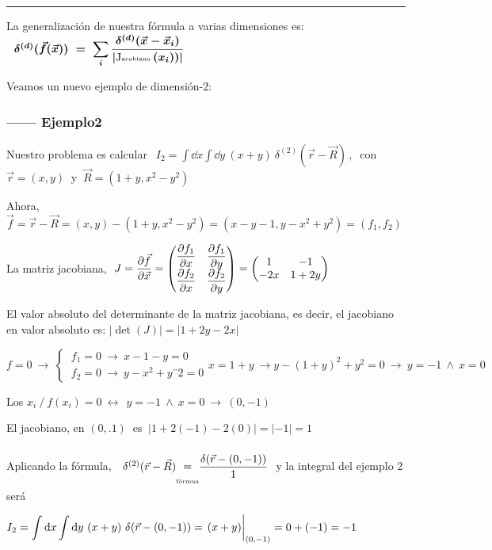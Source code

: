 \begin{center}\rule{200pt}{0.2pt}\end{center}
\vspace{0.5cm}


La generalización de nuestra fórmula a varias dimensiones es:
$\ \ \boldsymbol{ \delta^{(d)}( \vec f( \vec x)) \ = \ \displaystyle \sum_i \dfrac {\delta^{(d)}( \vec x-  \vec x_i)}{|\text{J\tiny{acobiano} }( x_i))|}  }$

Veamos un nuevo ejemplo de dimensión-2:
\subsubsection{------ Ejemplo2}

Nuestro problema es calcular $\ \ \displaystyle I_2=  \int \dd x \int \dd y \ (x+y)\ \delta^{(2)} (\vec r-\vec R)\, , \ $ con $\vec r=(x,y)\ $ y $\ \vec R=(1+y,x^2-y^2)$

Ahora, $\vec f=\vec r-\vec R=(x,y)-(1+y,x^2-y^2)=(x-y-1,y-x^2+y^2)=(f_1,f_2)$

La matriz jacobiana, $\ J=\displaystyle \pdv{\vec f}{\vec x}= \mqty(  \displaystyle \pdv{f_1}{x} &  \displaystyle \pdv{f_1}{y} \\  \displaystyle \pdv{f_2}{x} &  \displaystyle \pdv{f_2}{y} )=\mqty(1&-1\\-2x&1+2y)$

El valor absoluto del determinante de la matriz jacobiana, es decir, el jacobiano en valor absoluto es: $|\det(J)|=|1+2y-2x|$

$f=0 \ \to \ \begin{cases}  \ f_1=0 \ \to \ x-1-y=0 \\  \ f_2=0 \ \to \ y-x^2+y¨2=0 \end{cases} x=1+y \ \to y-(1+y)^2+y^2=0 \ \to \ y=-1 \ \wedge \ x=0$

Los $x_i\ / \ f(x_i)=0 \ \leftrightarrow \ \ y=-1 \ \wedge \ x=0 \ \to \ (0,-1)$

El jacobiano, en $(0,.1) \ \text{ es } \ |1+2(-1)-2(0)|=|-1|=1$

Aplicando la fórmula, $\ \ \delta^{(2)} (\vec r-\vec R)  
\begin{matrix} \\ = \\ \text{\tiny{fórmua}} \end{matrix} 
\dfrac
{\delta(\vec r - (0,-1))}{1} \ $ y la integral del ejemplo 2 será

$I_2= \displaystyle \int \dd x \int \dd y \ (x+y) \ \delta(\vec r-(0,-1)) = \eval{(x+y)}_{(0,-1)}=0+(-1)=-1$

